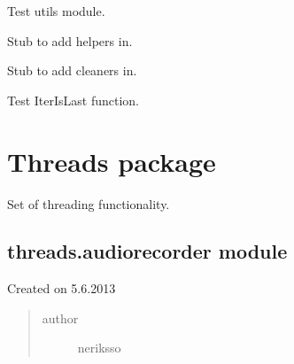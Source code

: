 \documentclass[letterpaper,10pt,english]{sphinxmanual}
\begin{document}
\begin{fulllineitems}
\label{testing:testing.TestUtils}
Test utils module.

\begin{fulllineitems}
\label{testing:testing.TestUtils.setUp}
Stub to add helpers in.

\end{fulllineitems}


\begin{fulllineitems}
\label{testing:testing.TestUtils.tearDown}
Stub to add cleaners in.

\end{fulllineitems}


\begin{fulllineitems}
\label{testing:testing.TestUtils.test_iterislast}
Test IterIsLast function.

\end{fulllineitems}


\end{fulllineitems}



\section{Threads package}
\label{threads:threads-package}\label{threads::doc}
Set of threading functionality.


\subsection{threads.audiorecorder module}
\label{threads:threads-audiorecorder-module}\label{threads:module-threads.audiorecorder}
Created on 5.6.2013
\begin{quote}\begin{description}
\item[{author}] \leavevmode
neriksso

\end{description}\end{quote}
\end{document}
